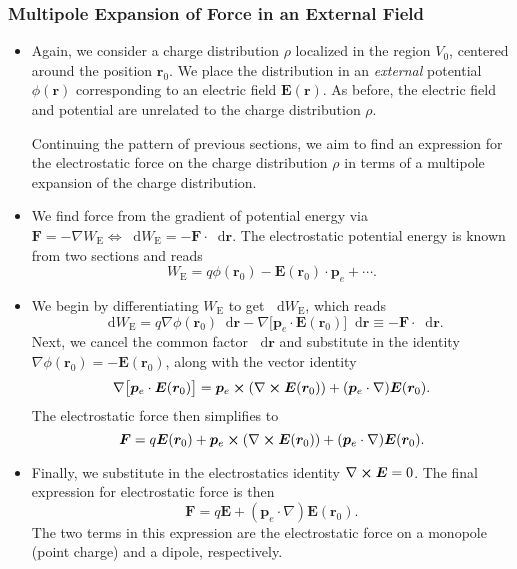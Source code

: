 \documentclass[11pt, a4paper]{article}
\newcommand{\diff}{\mathop{}\!\mathrm{d}} %
\renewcommand{\vec}[1]{\bm{#1}} %
\renewcommand{\r}{\vec{r}}
\newcommand{\E}{\vec{E}} %
\newcommand{\pe}{\vec{p}_{e}}  %
\renewcommand{\curl}{\nabla \cross}
\renewcommand{\grad}{\nabla}
\begin{document}
\subsubsection{Multipole Expansion of Force in an External Field}

\begin{itemize}
	\item Again, we consider a charge distribution $ \rho $ localized in the region $ V_{0} $, centered around the position $ \r_{0} $. We place the distribution in an \textit{external} potential $ \phi(\r) $ corresponding to an electric field $ \E(\r) $. As before, the electric field and potential are unrelated to the charge distribution $ \rho $.
	
    Continuing the pattern of previous sections, we aim to find an expression for the electrostatic force on the charge distribution $ \rho $ in terms of a multipole expansion of the charge distribution. 
	
	\item We find force from the gradient of potential energy via $ \vec{F} = - \grad W_{\text{E}} \iff \diff W_{\text{E}} = - \vec{F} \cdot \diff \r $. The electrostatic potential energy is known from two sections and reads
    \begin{equation*}
        W_{\text{E}} = q \phi(\r_{0}) - \E(\r_{0}) \cdot \pe + \cdots. 
    \end{equation*}

	\item We begin by differentiating $ W_{\text{E}} $ to get $ \diff W_{\text{E}} $, which reads
	\begin{equation*}
		\diff W_{\text{E}} = q \grad \phi(\r_{0})\diff \r - \grad \big[\pe \cdot \E(\r_{0})\big]\diff \r \equiv - \vec{F} \cdot \diff \r.
	\end{equation*}
	Next, we cancel the common factor $ \diff \r $ and substitute in the identity $ \grad \phi(\r_{0}) = - \E(\r_{0}) $, along with the vector identity 
	\begin{equation*}
		\grad\big[\pe \cdot \E(\r_{0})\big] = \pe \cross (\curl \E(\r_{0})) + (\pe \cdot \grad)\E(\r_{0}).
	\end{equation*}
    The electrostatic force then simplifies to
    \begin{equation*}
        \vec{F} = q \E(\r_{0}) + \pe \cross (\curl \E(\r_{0})) + (\pe \cdot \grad)\E(\r_{0}).
    \end{equation*}
    
    \item Finally, we substitute in the electrostatics identity $ \curl \E = 0 $. The final expression for electrostatic force is then
	\begin{equation*}
		\vec{F} = q \E + (\pe \cdot \grad)\E(\r_{0}).
	\end{equation*}
    The two terms in this expression are the electrostatic force on a monopole (point charge) and a dipole, respectively.
	
\end{itemize}
\end{document}
